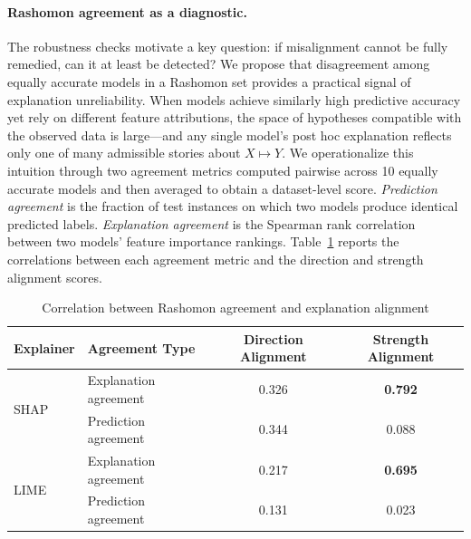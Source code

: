 \documentclass[11pt]{article}
\begin{document}
\paragraph{Rashomon agreement as a diagnostic.}
The robustness checks motivate a key question: if misalignment cannot be fully remedied, can it at least be detected? We propose that disagreement among equally accurate models in a Rashomon set provides a practical signal of explanation unreliability. When models achieve similarly high predictive accuracy yet rely on different feature attributions, the space of hypotheses compatible with the observed data is large---and any single model's post hoc explanation reflects only one of many admissible stories about $X \mapsto Y$. We operationalize this intuition through two agreement metrics computed pairwise across 10 equally accurate models and then averaged to obtain a dataset-level score. \textit{Prediction agreement} is the fraction of test instances on which two models produce identical predicted labels. \textit{Explanation agreement} is the Spearman rank correlation between two models' feature importance rankings. Table~\ref{tab:rashomon_agreement_corr} reports the correlations between each agreement metric and the direction and strength alignment scores.

\begin{table}[h]
\centering
\small
\caption{Correlation between Rashomon agreement and explanation alignment}
\label{tab:rashomon_agreement_corr}
\begin{tabular}{l l c c}
\toprule
\textbf{Explainer} & \textbf{Agreement Type} & \textbf{Direction Alignment} & \textbf{Strength Alignment} \\
\midrule
\multirow{2}{*}{SHAP}
    & Explanation agreement & 0.326 & \textbf{0.792} \\
    & Prediction agreement  & 0.344 & 0.088  \\
\midrule
\multirow{2}{*}{LIME}
    & Explanation agreement & 0.217 & \textbf{0.695} \\
    & Prediction agreement  & 0.131 & 0.023  \\
\bottomrule
\end{tabular}
\end{table}
\normalsize
\end{document}
